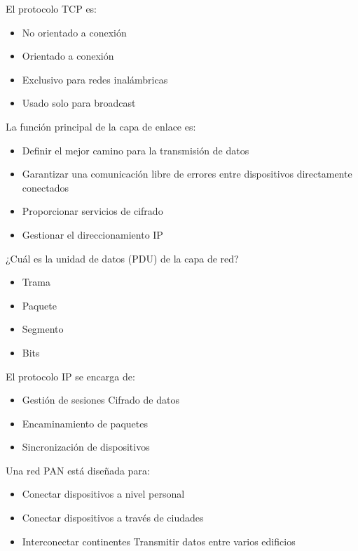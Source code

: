 \documentclass[11pt]{article}
\begin{document}
El protocolo TCP es:

\begin{itemize}
\item No orientado a conexión

\item Orientado a conexión

\item Exclusivo para redes inalámbricas

\item Usado solo para broadcast
\end{itemize}

La función principal de la capa de enlace es:

\begin{itemize}
\item Definir el mejor camino para la transmisión de datos

\item Garantizar una comunicación libre de errores entre dispositivos directamente conectados

\item Proporcionar servicios de cifrado

\item Gestionar el direccionamiento IP
\end{itemize}

¿Cuál es la unidad de datos (PDU) de la capa de red?

\begin{itemize}
\item Trama

\item Paquete

\item Segmento

\item Bits
\end{itemize}

El protocolo IP se encarga de:

\begin{itemize}
\item Gestión de sesiones Cifrado de datos

\item Encaminamiento de paquetes

\item Sincronización de dispositivos
\end{itemize}

Una red PAN está diseñada para:

\begin{itemize}
\item Conectar dispositivos a nivel personal

\item Conectar dispositivos a través de ciudades

\item Interconectar continentes Transmitir datos entre varios edificios
\end{itemize}
\end{document}

